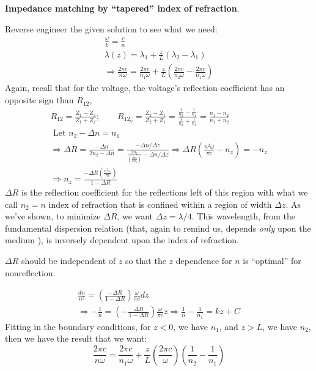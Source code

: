 \documentclass[twoside,10pt]{amsart}
\newcommand{\problemhead}[1]
  {\smallskip
   \noindent{\large\bf Problem #1.}
   \smallskip}
\begin{document}
\problemhead{5.22} \textbf{ Impedance matching by ``tapered'' index of refraction}.  

Reverse engineer the given solution to see what we need:
\[
\begin{gathered}
  \boxed{ \frac{ \omega }{ k } = \frac{ c}{ n} } \\
  \lambda(z) = \lambda_1 + \frac{ z}{L} ( \lambda_2 - \lambda_1 ) \\
  \Longrightarrow \frac{ 2 \pi c }{ n \omega } = \frac{ 2 \pi c }{ n_1 \omega } + \frac{ z}{ L} \left( \frac{ 2 \pi c }{ n_2 \omega } - \frac{ 2 \pi c}{ n_1 \omega } \right)
\end{gathered}
\]
Again, recall that for the voltage, the voltage's reflection coefficient has an opposite sign than $R_{12}$,
\[
\begin{gathered}
  R_{12} = \frac{ Z_1 - Z_2 }{ Z_1 + Z_2 }; \quad \quad R_{12_V} = \frac{ Z_2 - Z_1}{ Z_2 + Z_1} = \frac{ \frac{1}{n_2} - \frac{1}{ n_1} }{ \frac{1}{ n_2 } + \frac{1}{ n_1 } } = \frac{ n_1 - n_2 }{ n_1 + n_2 } \\
  \text{ Let } n_2 - \Delta n = n_1  \\
  \Longrightarrow \Delta R = \frac{ - \Delta n }{ 2 n_2 - \Delta n } = \frac{ - \Delta n / \Delta z }{ \frac{ 2 n_2}{ \left( \frac{ 2 \pi c }{ \omega n_2 } \right) } - \Delta n/ \Delta z } \Longrightarrow \Delta R \left( \frac{ n^2 \omega }{ \pi c } - n_z \right) = - n_z \\
  \Longrightarrow n_z = \frac{ - \Delta R \left( \frac{ n^2 \omega }{ \pi c } \right) }{ 1 - \Delta R }
\end{gathered}
\]
$\Delta R$ is the reflection coefficient for the reflections left of this region with what we call $n_2=n$ index of refraction that is confined within a region of width $\Delta z$.  As we've shown, to minimize $\Delta R$, we want $\Delta z = \lambda/4$.  This wavelength, from the fundamental dispersion relation (that, again to remind us, depends \emph{ only } upon the medium ), is inversely dependent upon the index of refraction.  

$\Delta R$ should be independent of $z$ so that the $z$ dependence for $n$ is ``optimal'' for nonreflection.  

\[
\begin{gathered}
  \frac{dn}{n^2} = \left( \frac{ - \Delta R}{ 1 - \Delta R} \right) \frac{ \omega}{ \pi c } dz \\ 
  \Longrightarrow -\frac{1}{n} = \left( - \frac{ \Delta R }{ 1 - \Delta R} \right) \frac{ \omega }{ \pi c } z \Longrightarrow \frac{1}{n} - \frac{1}{n_1} = k z + C 
\end{gathered}
\]  
Fitting in the boundary conditions, for $z<0$, we have $n_1$, and $z>L$, we have $n_2$, then we have the result that we want:
\[
\boxed{ \frac{ 2 \pi c }{ n \omega } = \frac{ 2 \pi c }{ n_1 \omega } + \frac{z}{L} \left( \frac{ 2 \pi c }{ \omega } \right) \left( \frac{1}{ n_2 } - \frac{1}{n_1} \right) }
\]
\end{document}
